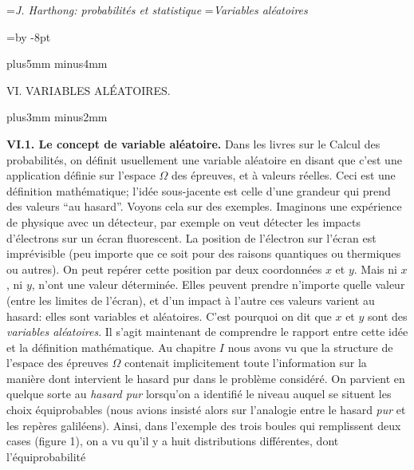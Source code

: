 


\auteurcourant={\sl J. Harthong: probabilit\'es et statistique}
\titrecourant={\sl Variables al\'eatoires}


\newdimen\blocksize  \blocksize=\vsize \advance\blocksize by -8pt
\def\struta{\vrule depth1.8pt width0pt}
\def\strutb{\vrule height7.5pt width0pt}
\def\ata{\hskip-2.5pt}
\def\aub{\hskip1pt}

\null\vskip10mm plus5mm minus4mm

\centerline{\tit VI.  VARIABLES AL\'EATOIRES.}

\vskip10mm plus3mm minus2mm

{\bf VI.\aub 1. Le concept de variable al\'eatoire.}
\medskip
Dans les livres sur le Calcul des probabilit\'es, on d\'efinit usuellement 
une variable al\'eatoire en disant que c'est une application d\'efinie sur
l'espace $\Omega$ des \'epreuves, et \`a valeurs r\'eelles.
\medskip
Ceci est une d\'efinition math\'ematique; l'id\'ee sous-jacente est celle 
d'une grandeur qui prend des valeurs ``au hasard''. Voyons cela sur des
exemples. Imaginons une exp\'erience de physique avec un d\'etecteur, 
par exemple on veut d\'etecter les impacts d'\'electrons sur un \'ecran
fluorescent. La position de l'\'electron sur l'\'ecran est impr\'evisible 
(peu importe que ce soit pour des raisons quantiques ou thermiques ou
autres). On peut rep\'erer cette position par deux coordonn\'ees $x$ et
$y$. Mais ni $x$, ni $y$, n'ont une valeur d\'etermin\'ee. Elles peuvent
prendre n'importe quelle valeur (entre les limites de l'\'ecran), et d'un
impact \`a l'autre ces valeurs varient au hasard: elles sont variables et
al\'eatoires. C'est pourquoi on dit que $x$ et $y$ sont des {\it variables
al\'eatoires}. Il s'agit maintenant de comprendre le rapport entre cette
id\'ee et la d\'efinition math\'ematique. 
\medskip
Au chapitre $I$ nous avons vu que la structure de l'espace des \'epreuves
$\Omega$ contenait implicitement  toute l'information sur la mani\`ere 
dont intervient le hasard pur dans le probl\`eme consid\'er\'e. On parvient
en quelque sorte au {\it hasard pur} lorsqu'on a identifi\'e le niveau 
auquel se situent les choix \'equiprobables (nous avions insist\'e alors
sur l'analogie entre le hasard {\it pur} et les rep\`eres galil\'eens). Ainsi,
dans l'exemple des trois boules qui remplissent deux cases (figure 1), on
a vu qu'il y a  huit distributions diff\'erentes, dont l'\'equiprobabilit\'e
